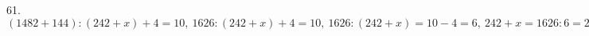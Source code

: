 61. $(1482+144):(242+x)+4=10,\ 1626:(242+x)+4=10,\ 1626:(242+x)=10-4=6,\ 242+x=1626:6=271,\ x=271-242=29.$\\
